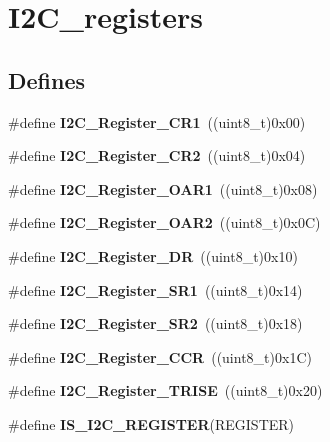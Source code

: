 \hypertarget{group__I2C__registers}{
\section{I2C\_\-registers}
\label{group__I2C__registers}
}
\subsection*{Defines}
\begin{DoxyCompactItemize}
\item 
\hypertarget{group__I2C__registers_ga4b9e7934e490c3540e50cf2f1d0a7688}{
\#define {\bfseries I2C\_\-Register\_\-CR1}~((uint8\_\-t)0x00)}
\label{group__I2C__registers_ga4b9e7934e490c3540e50cf2f1d0a7688}

\item 
\hypertarget{group__I2C__registers_gaf278337dd03b6ae56eac3f335381eca3}{
\#define {\bfseries I2C\_\-Register\_\-CR2}~((uint8\_\-t)0x04)}
\label{group__I2C__registers_gaf278337dd03b6ae56eac3f335381eca3}

\item 
\hypertarget{group__I2C__registers_ga706317a00c0d450e95c00efd2afe1836}{
\#define {\bfseries I2C\_\-Register\_\-OAR1}~((uint8\_\-t)0x08)}
\label{group__I2C__registers_ga706317a00c0d450e95c00efd2afe1836}

\item 
\hypertarget{group__I2C__registers_gaffdc1902493456dea95216a39fc54e2b}{
\#define {\bfseries I2C\_\-Register\_\-OAR2}~((uint8\_\-t)0x0C)}
\label{group__I2C__registers_gaffdc1902493456dea95216a39fc54e2b}

\item 
\hypertarget{group__I2C__registers_gaea281721e7a8461d90bf59898487c096}{
\#define {\bfseries I2C\_\-Register\_\-DR}~((uint8\_\-t)0x10)}
\label{group__I2C__registers_gaea281721e7a8461d90bf59898487c096}

\item 
\hypertarget{group__I2C__registers_gaf3bc5f4dc87513e2eceba4f503c14d6a}{
\#define {\bfseries I2C\_\-Register\_\-SR1}~((uint8\_\-t)0x14)}
\label{group__I2C__registers_gaf3bc5f4dc87513e2eceba4f503c14d6a}

\item 
\hypertarget{group__I2C__registers_ga0b5f7949e449223ec97e0169d79d007d}{
\#define {\bfseries I2C\_\-Register\_\-SR2}~((uint8\_\-t)0x18)}
\label{group__I2C__registers_ga0b5f7949e449223ec97e0169d79d007d}

\item 
\hypertarget{group__I2C__registers_ga7a0de765650408f3915b54141f052c5b}{
\#define {\bfseries I2C\_\-Register\_\-CCR}~((uint8\_\-t)0x1C)}
\label{group__I2C__registers_ga7a0de765650408f3915b54141f052c5b}

\item 
\hypertarget{group__I2C__registers_ga488c25a0a9f2c572af28768589fcbab2}{
\#define {\bfseries I2C\_\-Register\_\-TRISE}~((uint8\_\-t)0x20)}
\label{group__I2C__registers_ga488c25a0a9f2c572af28768589fcbab2}

\item 
\#define {\bfseries IS\_\-I2C\_\-REGISTER}(REGISTER)
\end{DoxyCompactItemize}


